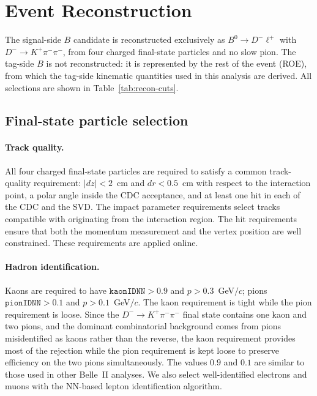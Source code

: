 \section{Event Reconstruction}
\label{sec:reconstruction}

The signal-side $B$ candidate is reconstructed exclusively as
$B^{0} \to D^{-} \ell^{+}$ with $D^{-} \to K^{+} \pi^{-} \pi^{-}$, from four
charged final-state particles and no slow pion.
The tag-side $B$ is not reconstructed: it is represented by the rest of the
event (ROE), from which the tag-side kinematic quantities used in this
analysis are derived.
All selections are shown in Table~\ref{tab:recon-cuts}.

\subsection{Final-state particle selection}
\label{sec:recon:fsp}

\paragraph{Track quality.}
All four charged final-state particles are required to satisfy a common
track-quality requirement: $|dz| < 2$~cm and $dr < 0.5$~cm with respect to the
interaction point, a polar angle inside the CDC acceptance, and at least one
hit in each of the CDC and the SVD.
The impact parameter requirements select tracks compatible with originating
from the interaction region. The hit requirements ensure that both the
momentum measurement and the vertex position are well constrained.
These requirements are applied online.

\paragraph{Hadron identification.}
Kaons are required to have $\texttt{kaonIDNN} > 0.9$ and $p > 0.3$~GeV$/c$;
pions $\texttt{pionIDNN} > 0.1$ and $p > 0.1$~GeV$/c$.
 The kaon requirement is tight while the
pion requirement is loose.
Since the $D^{-} \to K^{+} \pi^{-} \pi^{-}$ final state contains one kaon and
two pions, and the dominant combinatorial background comes from pions
misidentified as kaons rather than the reverse, the kaon requirement provides
most of the rejection while the pion requirement is kept loose to preserve
efficiency on the two pions simultaneously.
The values $0.9$ and $0.1$ are similar to those used in other Belle~II analyses.
We also select well-identified electrons and muons with the NN-based lepton identification algorithm.



